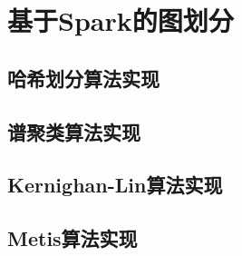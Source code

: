 \section{基于Spark的图划分}

\subsection{哈希划分算法实现}

\subsection{谱聚类算法实现}

\subsection{Kernighan-Lin算法实现}

\subsection{Metis算法实现}